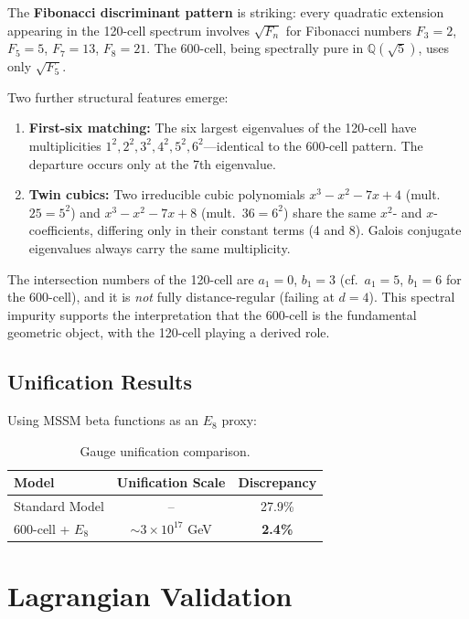 \documentclass[12pt,a4paper]{article}
\begin{document}
The \textbf{Fibonacci discriminant pattern} is striking: every quadratic extension appearing in the 120-cell spectrum involves $\sqrt{F_n}$ for Fibonacci numbers $F_3 = 2$, $F_5 = 5$, $F_7 = 13$, $F_8 = 21$. The 600-cell, being spectrally pure in $\mathbb{Q}(\sqrt{5})$, uses only $\sqrt{F_5}$.

Two further structural features emerge:
\begin{enumerate}
\item \textbf{First-six matching:} The six largest eigenvalues of the 120-cell have multiplicities $1^2, 2^2, 3^2, 4^2, 5^2, 6^2$---identical to the 600-cell pattern. The departure occurs only at the 7th eigenvalue.
\item \textbf{Twin cubics:} Two irreducible cubic polynomials $x^3 - x^2 - 7x + 4$ (mult.~$25 = 5^2$) and $x^3 - x^2 - 7x + 8$ (mult.~$36 = 6^2$) share the same $x^2$- and $x$-coefficients, differing only in their constant terms (4 and 8). Galois conjugate eigenvalues always carry the same multiplicity.
\end{enumerate}

The intersection numbers of the 120-cell are $a_1 = 0$, $b_1 = 3$ (cf.\ $a_1 = 5$, $b_1 = 6$ for the 600-cell), and it is \emph{not} fully distance-regular (failing at $d = 4$). This spectral impurity supports the interpretation that the 600-cell is the fundamental geometric object, with the 120-cell playing a derived role.

\subsection{Unification Results}

Using MSSM beta functions as an $E_8$ proxy:

\begin{table}[H]
\centering
\begin{tabular}{lcc}
\toprule
\textbf{Model} & \textbf{Unification Scale} & \textbf{Discrepancy} \\
\midrule
Standard Model & -- & 27.9\% \\
600-cell + $E_8$ & $\sim 3 \times 10^{17}$ GeV & \textbf{2.4\%} \\
\bottomrule
\end{tabular}
\caption{Gauge unification comparison.}
\end{table}

\section{Lagrangian Validation}
\end{document}
